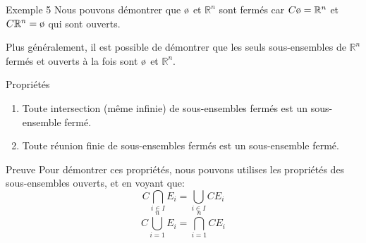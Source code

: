\documentclass[a4paper]{article}
\begin{document}
\begin{parag}{Exemple 5}
    Nous pouvons démontrer que $\o$ et $\mathbb{R}^n$ sont fermés car $C\o = \mathbb{R}^n$ et $C\mathbb{R}^n = \o$ qui sont ouverts.

    Plus généralement, il est possible de démontrer que les seuls sous-ensembles de $\mathbb{R}^n$ fermés et ouverts à la fois sont $\o$ et $\mathbb{R}^n$.
\end{parag}

\begin{parag}{Propriétés}
    \begin{enumerate}[left=0pt]
        \item Toute intersection (même infinie) de sous-ensembles fermés est un sous-ensemble fermé.
        \item Toute réunion finie de sous-ensembles fermés est un sous-ensemble fermé.
    \end{enumerate}

    \begin{subparag}{Preuve}
        Pour démontrer ces propriétés, nous pouvons utilises les propriétés des sous-ensembles ouverts, et en voyant que:
        \[C \bigcap_{i \in I} E_i = \bigcup_{i \in I} C E_i\]
        \[C \bigcup_{i =1}^n E_i = \bigcap_{i =1}^n C E_i\]
    \end{subparag}
\end{parag}
\end{document}
